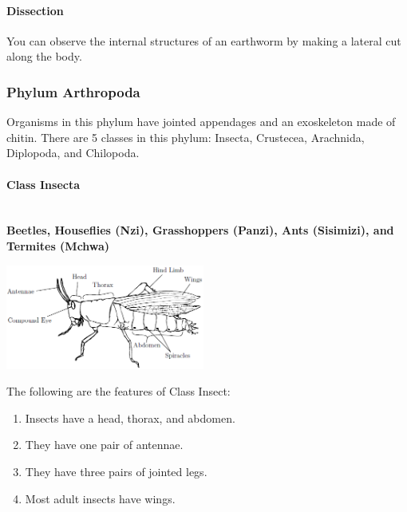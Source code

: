 \begin{multicols}{2}
\paragraph{Dissection}
You can observe the internal structures of an earthworm by making a lateral cut along the body.

%

\subsubsection{Phylum Arthropoda}
Organisms in this phylum have jointed appendages and an exoskeleton made of chitin. There are 5 classes in this phylum: Insecta, Crustecea, Arachnida, Diplopoda, and Chilopoda.

\setcounter{secnumdepth}{4}

\columnbreak

\paragraph{Class Insecta}\hfill \\
\textbf{Beetles, Houseflies (Nzi), Grasshoppers (Panzi), Ants (Sisimizi), and Termites (Mchwa)}

\begin{center}
\includegraphics[width=0.49\textwidth]{./img/grasshopper.png}
\end{center}

The following are the features of Class Insect:
\begin{enumerate}
\item{Insects have a head, thorax, and abdomen.}
\item{They have one pair of antennae.}
\item{They have three pairs of jointed legs.}
\item{Most adult insects have wings.}
\end{enumerate}


\end{multicols}
